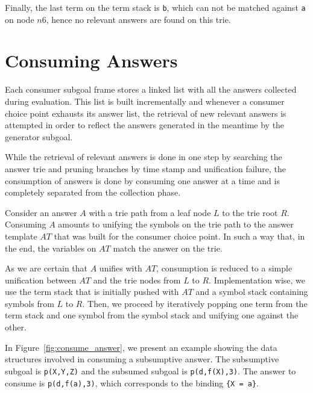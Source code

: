 Finally, the last term on the term stack is \texttt{b}, which
can not be matched against \texttt{a} on node $n6$, hence no
relevant answers are found on this trie.

\section{Consuming Answers}

Each consumer subgoal frame stores a linked list with all the answers collected
during evaluation. This list is built incrementally and
whenever a consumer choice point exhausts its answer list, the retrieval
of new relevant answers is attempted in order to reflect the answers generated in the meantime
by the generator subgoal.

While the retrieval of relevant answers is done in one step by searching the answer trie
and pruning branches by time stamp and unification failure, the consumption of
answers is done by consuming one answer at a time and is completely separated from the collection phase.

Consider an answer $A$ with a trie path from a leaf node $L$ to
the trie root $R$. Consuming $A$ amounts to unifying the symbols on the trie path
to the answer template $AT$ that was built for the consumer choice point. In such a way that, in the end,
the variables on $AT$ match the answer on the trie.

As we are certain that $A$ unifies with $AT$, consumption is reduced to a simple unification
between $AT$ and the trie nodes from $L$ to $R$.
Implementation wise, we use the term stack that is initially pushed with $AT$
and a symbol stack containing symbols from $L$ to $R$. Then, we proceed by
iteratively popping one term from the term stack and one symbol from the symbol stack
and unifying one against the other.

In Figure~\ref{fig:consume_answer}, we present an example showing the data structures involved in consuming
a subsumptive answer. The subsumptive subgoal is \texttt{p(X,Y,Z)} and the
subsumed subgoal is \texttt{p(d,f(X),3)}. The answer to consume is \texttt{p(d,f(a),3)},
which corresponds to the binding \texttt{\{X~=~a\}}.

